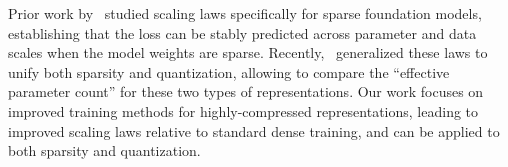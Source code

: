 Prior work by~\citet{frantar2023scalinglawssparselyconnectedfoundation, jin2025journeymattersaverageparameter} studied scaling laws specifically for sparse foundation models, establishing that the loss can be stably predicted across parameter and data scales when the model weights are sparse. Recently,~\citet{frantar2025compressionscaling} generalized these laws to unify both sparsity and quantization, allowing to compare the ``effective parameter count'' for these two types of representations. Our work focuses on improved training methods for highly-compressed representations, leading to improved scaling laws relative to standard dense training, and can be applied to both sparsity and quantization.  


\vspace{-0.7em}